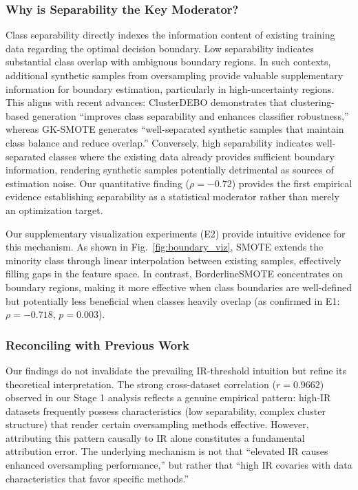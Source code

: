 \documentclass[12pt,a4paper]{article}
\theoremstyle{definition}
\begin{document}
\subsubsection{Why is Separability the Key Moderator?}
Class separability directly indexes the information content of existing training data regarding the optimal decision boundary. Low separability indicates substantial class overlap with ambiguous boundary regions. In such contexts, additional synthetic samples from oversampling provide valuable supplementary information for boundary estimation, particularly in high-uncertainty regions. This aligns with recent advances: ClusterDEBO \cite{clusterdebo2025} demonstrates that clustering-based generation ``improves class separability and enhances classifier robustness,'' whereas GK-SMOTE \cite{gk_smote2025} generates ``well-separated synthetic samples that maintain class balance and reduce overlap.'' Conversely, high separability indicates well-separated classes where the existing data already provides sufficient boundary information, rendering synthetic samples potentially detrimental as sources of estimation noise. Our quantitative finding ($\rho=-0.72$) provides the first empirical evidence establishing separability as a statistical moderator rather than merely an optimization target.

Our supplementary visualization experiments (E2) provide intuitive evidence for this mechanism. As shown in Fig.~\ref{fig:boundary_viz}, SMOTE extends the minority class through linear interpolation between existing samples, effectively filling gaps in the feature space. In contrast, BorderlineSMOTE concentrates on boundary regions, making it more effective when class boundaries are well-defined but potentially less beneficial when classes heavily overlap (as confirmed in E1: $\rho = -0.718$, $p = 0.003$).

\subsubsection{Reconciling with Previous Work}
Our findings do not invalidate the prevailing IR-threshold intuition but refine its theoretical interpretation. The strong cross-dataset correlation ($r=0.9662$) observed in our Stage 1 analysis reflects a genuine empirical pattern: high-IR datasets frequently possess characteristics (low separability, complex cluster structure) that render certain oversampling methods effective. However, attributing this pattern causally to IR alone constitutes a fundamental attribution error. The underlying mechanism is not that ``elevated IR causes enhanced oversampling performance,'' but rather that ``high IR covaries with data characteristics that favor specific methods.''
\end{document}

